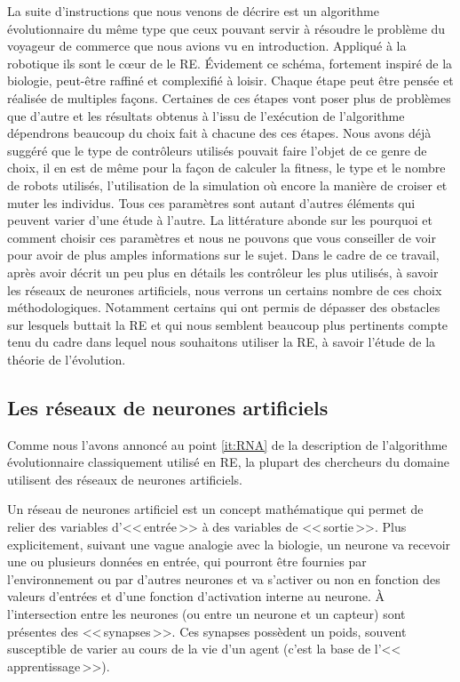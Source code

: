 La suite d'instructions que nous venons de décrire est un algorithme évolutionnaire du même type que ceux pouvant servir à résoudre le problème du voyageur de commerce que nous avions vu en introduction. Appliqué à la robotique ils sont le cœur de le RE.
Évidement ce schéma, fortement inspiré de la biologie, peut-être raffiné et complexifié à loisir. Chaque étape peut être pensée et réalisée de multiples façons. Certaines de ces étapes vont poser plus de problèmes que d'autre et les résultats obtenus à l'issu de l'exécution de l'algorithme dépendrons beaucoup du choix fait à chacune des ces étapes. Nous avons déjà suggéré que le type de contrôleurs utilisés pouvait faire l'objet de ce genre de choix, il en est de même pour la façon de calculer la fitness, le type et le nombre de robots utilisés, l'utilisation de la simulation où encore la manière de croiser et muter les individus. Tous ces paramètres sont autant d'autres éléments qui peuvent varier d'une étude à l'autre. La littérature abonde sur les pourquoi et comment choisir ces paramètres et nous ne pouvons que vous conseiller de voir \cite{nolfi00evolrobobiolintetechselfmach} pour avoir de plus amples informations sur le sujet. Dans le cadre de ce travail, après avoir décrit un peu plus en détails les contrôleur les plus utilisés, à savoir les réseaux de neurones artificiels, nous verrons un certains nombre de ces choix méthodologiques. Notamment certains qui ont permis de dépasser des obstacles sur lesquels buttait la RE et qui nous semblent beaucoup plus pertinents compte tenu du cadre dans lequel nous souhaitons utiliser la RE, à savoir l'étude de la théorie de l'évolution.


\subsection{Les réseaux de neurones artificiels}\label{sec:RNA}
Comme nous l'avons annoncé au point \ref{it:RNA} de la description de l'algorithme évolutionnaire classiquement utilisé en RE, la plupart des chercheurs du domaine utilisent des réseaux de neurones artificiels.

Un réseau de neurones artificiel est un concept mathématique qui permet de relier des variables d'<<\,entrée\,>> à des variables de <<\,sortie\,>>. Plus explicitement, suivant une vague analogie avec la biologie, un neurone va recevoir une ou plusieurs données en entrée, qui pourront être fournies par l'environnement ou par d'autres neurones et va s'activer ou non en fonction des valeurs d'entrées et d'une fonction d'activation interne au neurone. À l'intersection entre les neurones (ou entre un neurone et un capteur) sont présentes des <<\,synapses\,>>. Ces synapses possèdent un poids, souvent susceptible de varier au cours de la vie d'un agent (c'est la base de l'<<\,apprentissage\,>>).

